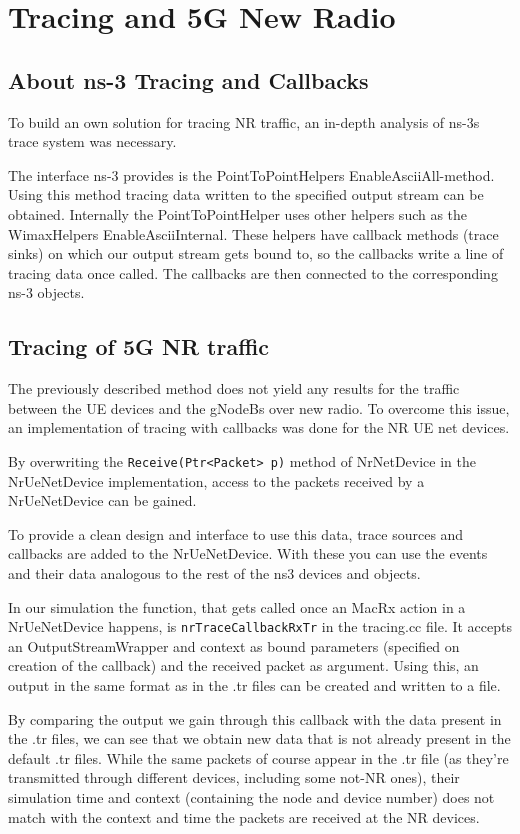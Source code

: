 \section{Tracing and 5G New Radio}
\subsection{About ns-3 Tracing and Callbacks}
To build an own solution for tracing NR traffic, an in-depth analysis of ns-3s trace system was necessary.

The interface ns-3 provides is the PointToPointHelpers EnableAsciiAll-method. Using this method tracing data written to the specified output stream can be obtained. Internally the PointToPointHelper uses other helpers such as the WimaxHelpers EnableAsciiInternal. These helpers have callback methods (trace sinks) on which our output stream gets bound to, so the callbacks write a line of tracing data once called. The callbacks are then connected to the corresponding ns-3 objects. 

\subsection{Tracing of 5G NR traffic}
The previously described method does not yield any results for the traffic between the UE devices and the gNodeBs over new radio. To overcome this issue, an implementation of tracing with callbacks was done for the NR UE net devices. 

By overwriting the \texttt{Receive(Ptr<Packet> p)} method of NrNetDevice in the NrUeNetDevice implementation, access to the packets received by a NrUeNetDevice can be gained.

To provide a clean design and interface to use this data, trace sources and callbacks are added to the NrUeNetDevice. With these you can use the events and their data analogous to the rest of the ns3 devices and objects.

In our simulation the function, that gets called once an MacRx action in a NrUeNetDevice happens, is \texttt{nrTraceCallbackRxTr} in the tracing.cc file. It accepts an OutputStreamWrapper and context as bound parameters (specified on creation of the callback) and the received packet as argument. Using this, an output in the same format as in the .tr files can be created and written to a file.

By comparing the output we gain through this callback with the data present in the .tr files, we can see that we obtain new data that is not already present in the default .tr files. While the same packets of course appear in the .tr file (as they're transmitted through different devices, including some not-NR ones), their simulation time and context (containing the node and device number) does not match with the context and time the packets are received at the NR devices. 

